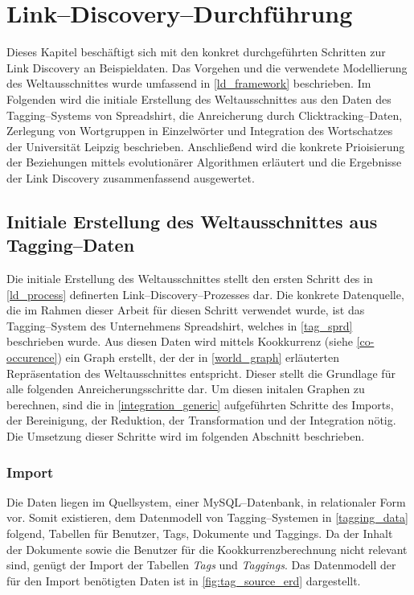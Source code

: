 \chapter{Link--Discovery--Durchführung}
\label{link_discovery}

Dieses Kapitel beschäftigt sich mit den konkret durchgeführten Schritten zur Link Discovery an Beispieldaten. Das Vorgehen und die verwendete Modellierung des Weltausschnittes wurde umfassend in \cref{ld_framework} beschrieben. Im Folgenden wird die initiale Erstellung des Weltausschnittes aus den Daten des Tagging--Systems von Spreadshirt, die Anreicherung durch Clicktracking--Daten, Zerlegung von Wortgruppen in Einzelwörter und Integration des Wortschatzes der Universität Leipzig beschrieben. Anschließend wird die konkrete Prioisierung der Beziehungen mittels evolutionärer Algorithmen erläutert und die Ergebnisse der Link Discovery zusammenfassend ausgewertet.

\section{Initiale Erstellung des Weltausschnittes aus Tagging--Daten}
\label{ld_tags}

Die initiale Erstellung des Weltausschnittes stellt den ersten Schritt des in \cref{ld_process} definerten Link--Discovery--Prozesses dar. Die konkrete Datenquelle, die im Rahmen dieser Arbeit für diesen Schritt verwendet wurde, ist das Tagging--System des Unternehmens Spreadshirt, welches in \cref{tag_sprd} beschrieben wurde. Aus diesen Daten wird mittels Kookkurrenz (siehe \cref{co-occurence}) ein Graph erstellt, der der in \cref{world_graph} erläuterten Repräsentation des Weltausschnittes entspricht. Dieser stellt die Grundlage für alle folgenden Anreicherungsschritte dar. Um diesen initalen Graphen zu berechnen, sind die in \cref{integration_generic} aufgeführten Schritte des Imports, der Bereinigung, der Reduktion, der Transformation und der Integration nötig. Die Umsetzung dieser Schritte wird im folgenden Abschnitt beschrieben.

\subsection{Import}

Die Daten liegen im Quellsystem, einer MySQL--Datenbank, in relationaler Form vor. Somit existieren, dem Datenmodell von Tagging--Systemen in \cref{tagging_data} folgend, Tabellen für Benutzer, Tags, Dokumente und Taggings. Da der Inhalt der Dokumente sowie die Benutzer für die Kookkurrenzberechnung nicht relevant sind, genügt der Import der Tabellen \emph{Tags} und \emph{Taggings}. Das Datenmodell der für den Import benötigten Daten ist in \cref{fig:tag_source_erd} dargestellt.

